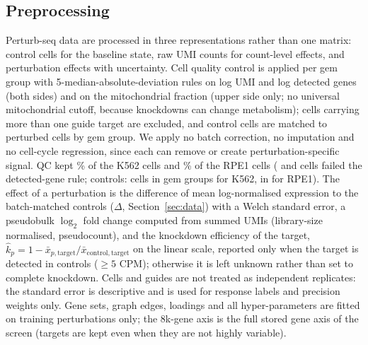 \subsection{Preprocessing}
\label{sec:prep}
Perturb-seq data are processed in three representations rather than one matrix: control cells for the baseline state, raw UMI counts for count-level effects, and perturbation effects with uncertainty. Cell quality control is applied per gem group with 5-median-absolute-deviation rules on log UMI and log detected genes (both sides) and on the mitochondrial fraction (upper side only; no universal mitochondrial cutoff, because knockdowns can change metabolism); cells carrying more than one guide target are excluded, and control cells are matched to perturbed cells by gem group. We apply no batch correction, no imputation and no cell-cycle regression, since each can remove or create perturbation-specific signal. QC kept \% of the  K562 cells and \% of the  RPE1 cells ( and  cells failed the detected-gene rule; controls:  cells in  gem groups for K562,  in  for RPE1).
The effect of a perturbation is the difference of mean log-normalised expression to the batch-matched controls ($\Delta$, Section~\ref{sec:data}) with a Welch standard error, a pseudobulk $\log_2$ fold change computed from summed UMIs (library-size normalised, pseudocount), and the knockdown efficiency of the target, $\hat k_p=1-\bar x_{p,\mathrm{target}}/\bar x_{\mathrm{control,target}}$ on the linear scale, reported only when the target is detected in controls ($\ge5$ CPM); otherwise it is left unknown rather than set to complete knockdown. Cells and guides are not treated as independent replicates: the standard error is descriptive and is used for response labels and precision weights only. Gene sets, graph edges, loadings and all hyper-parameters are fitted on training perturbations only; the 8k-gene axis is the full stored gene axis of the screen (targets are kept even when they are not highly variable).

